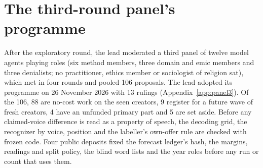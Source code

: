 \section{The third-round panel's programme}
\label{sec:panel3}

After the exploratory round, the lead moderated a third panel of twelve model agents playing roles (six method members,
three domain and emic members and three denialists; no practitioner, ethics member or sociologist of religion sat),
which met in four rounds and pooled 106 proposals. The lead adopted its programme on 26 November 2026 with 13 rulings
(Appendix~\ref{app:panel3}). Of the 106, 88 are no-cost work on the seen creators, 9 register for a future wave of fresh
creators, 4 have an unfunded primary part and 5 are set aside. Before any claimed-voice difference is read as a property
of speech, the decoding grid, the recognizer by voice, position and the labeller's own-offer rule are checked with
frozen code. Four public deposits fixed the forecast ledger's hash, the margins, readings and split policy, the blind
word lists and the year roles before any run or count that uses them.

